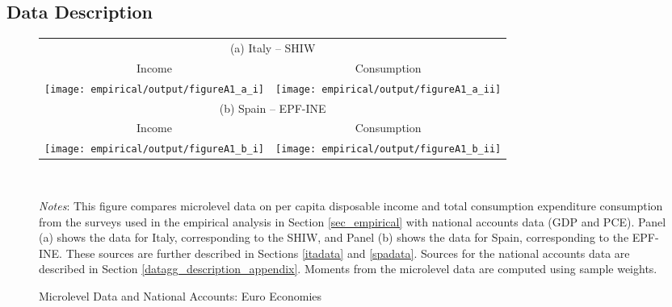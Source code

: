 \documentclass[12pt]{article}
\begin{document}
\begin{spacing}{1.5}
\section{Data Description} \label{data_appendix}


\begin{figure}[H]
\begin{tabular}{cc}
\multicolumn{2}{c}{(a) Italy -- SHIW} \vspace{.4em}  \\
 Income & Consumption \\
\texttt{[image: empirical/output/figureA1\_a\_i]} &
\texttt{[image: empirical/output/figureA1\_a\_ii]} \\
\multicolumn{2}{c}{(b) Spain -- EPF-INE} \vspace{.4em}  \\
 Income & Consumption \\
\texttt{[image: empirical/output/figureA1\_b\_i]} &
\texttt{[image: empirical/output/figureA1\_b\_ii]} \\
\end{tabular} \\
\caption{Microlevel Data and National Accounts: Euro Economies \label{macro_micro_euro}}
\medskip{}
\raggedright{}\textit{\footnotesize{}Notes}{\footnotesize{}: This figure compares microlevel data on per capita disposable income and total consumption expenditure consumption from the surveys used in the empirical analysis in Section \ref{sec_empirical} with national accounts data (GDP and PCE).  Panel (a) shows the data for Italy, corresponding to the SHIW, and Panel (b) shows the data for Spain, corresponding to the EPF-INE.  These sources are further described in Sections \ref{itadata} and \ref{spadata}. Sources for the national accounts data are described in Section  \ref{datagg_description_appendix}. Moments from the microlevel data are computed using sample weights.
}{\footnotesize\par}
\end{figure}



\end{spacing}
\end{document}

